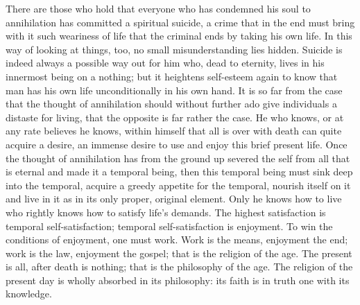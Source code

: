 \documentclass[12pt,a4paper,openany]{book}
\newcommand{\opage}[1]{\marginnote{\footnotesize\textit{[#1]}}}
\begin{document}
There are those who hold that everyone who has condemned
his soul to annihilation has committed a spiritual
suicide, a crime that in the end must bring with it
such weariness of life that the criminal ends by taking his own
life. In this way of looking at things, too, no small
misunderstanding lies hidden. Suicide is indeed always a
possible way out for him who, dead to eternity, lives
in his innermost being on a nothing; but it heightens self-esteem again to
know that man has his own life unconditionally in his own
hand. It is so far from the case that the thought of annihilation
\setcounter{footnote}{0}%
\opage{200}should without further ado give individuals a distaste for living, that
the opposite is far rather the case. He who knows,
or at any rate believes he knows, within himself that all is over with
death can quite acquire a desire, an immense desire to use
and enjoy this brief present life. Once the thought of annihilation
has from the ground up severed the self from all that is
eternal and made it a temporal being, then
this temporal being must sink deep into the temporal, acquire
a greedy appetite for the temporal, nourish itself on it and
live in it as in its only proper, original element.
Only he knows how to live who rightly knows how to satisfy
life's demands. The highest satisfaction is
temporal self-satisfaction; temporal self-satisfaction
is enjoyment. To win the conditions of enjoyment, one must
work. Work is the means, enjoyment the end; work
is the law, enjoyment the gospel; that is the religion of the age.
The present is all, after death is nothing;
that is the philosophy of the age. The religion of the present day is wholly
absorbed in its philosophy: its faith is in truth one
with its knowledge.
\end{document}
